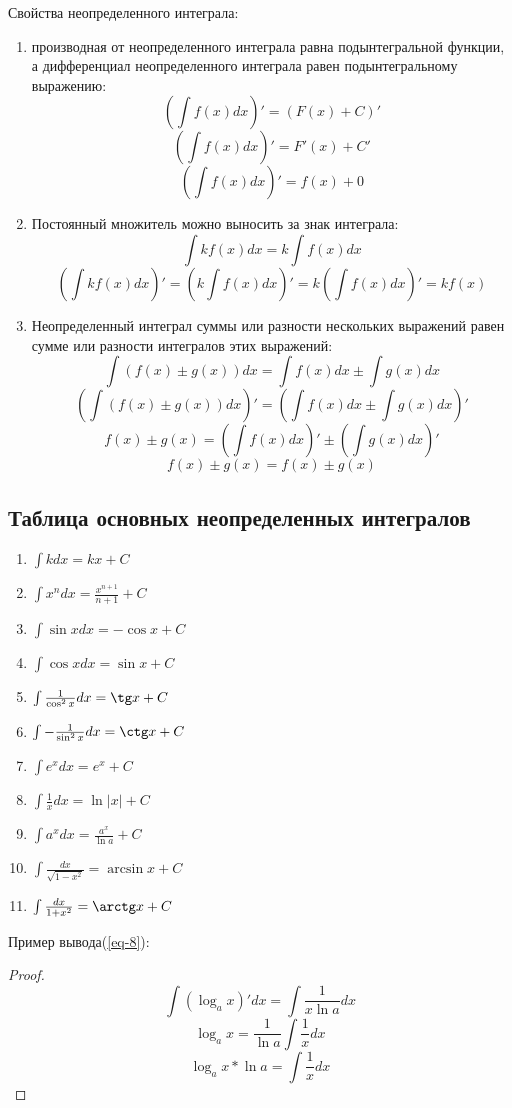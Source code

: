 \documentclass[12pt,a4paper]{article}
\begin{document}
Свойства неопределенного интеграла:
\begin{enumerate}
\item{производная от неопределенного интеграла равна подынтегральной функции, а дифференциал неопределенного интеграла равен подынтегральному выражению:
\[ (\int f(x)dx)' = (F(x) + C)' \]
\[ (\int f(x)dx)' = F'(x) + C' \]
\[ (\int f(x)dx)' = f(x) + 0 \]
}
\item{
Постоянный множитель можно выносить за знак интеграла:
\[ \int kf(x)dx = k \int f(x)dx \]
\[ (\int kf(x)dx)' = (k \int f(x)dx)' = k( \int f(x)dx)' = kf(x) \]
}
\item{
Неопределенный интеграл суммы или разности нескольких выражений равен сумме или разности интегралов этих выражений:
\[ \int (f(x) \pm g(x))dx = \int f(x)dx \pm \int g(x)dx \]
}
\[ (\int(f(x) \pm g(x))dx)' = (\int f(x)dx \pm \int g(x)dx )'  \]
\[ f(x) \pm g(x) = (\int f(x)dx)' \pm (\int g(x)dx)' \]
\[ f(x) \pm g(x) = f(x) \pm g(x) \]
\end{enumerate}
\subsection{Таблица основных неопределенных интегралов}

\begin{enumerate}[leftmargin=*, itemsep=0.4ex, before={\everymath{\displaystyle}}]%
\item{
$\int kdx = kx + C$
}
\item{
$\int x^ndx = \frac{x^{n + 1}}{n + 1} + C$
}
\item{
$\int \sin xdx = - \cos x + C$
}
\item{
$\int \cos xdx = \sin x + C$
}
\item{
$\int \frac{1}{\cos^2 x}dx = \tg x + C$
}
\item{
$\int - \frac{1}{\sin^2 x} dx = \ctg x + C$
}
\item{
$\int e^x dx = e^x + C$
}
\item{
$\int \frac{1}{x}dx = \ln |x| + C$
} \label{eq-8}
\item{
$\int a^xdx = \frac{a^x}{\ln a} + C$
}
\item{
$\int \frac{dx}{\sqrt{1 - x^2}} = \arcsin x + C$
}
\item{
$\int \frac{dx}{1 + x^2} = \arctg x + C$
}
\end{enumerate}
 Пример вывода(\ref{eq-8}):
\begin{proof}
\[ \int (\log_{a} x)'dx = \int \frac{1}{x \ln a}dx\]
\[ \log_{a} x = \frac {1}{\ln a} \int \frac{1}{x} dx \]
\[ \log_{a} x * \ln a = \int \frac{1}{x} dx \]
\end{proof}
\end{document}

